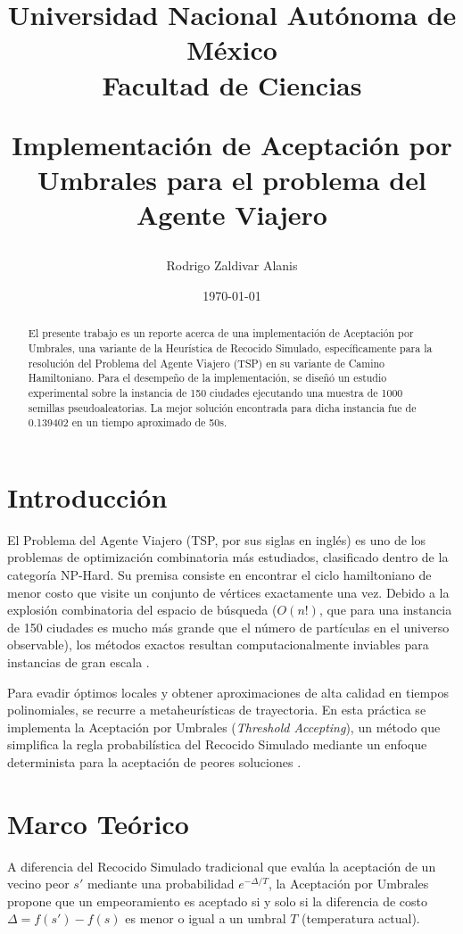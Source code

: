 \documentclass[12pt,letterpaper]{article}
\author{Rodrigo Zaldivar Alanis}
\title{
    \vspace{-2cm}
    \begin{center}
        \Large \textbf{Universidad Nacional Autónoma de México} \\
        \vspace{0.2cm}
        \large \textbf{Facultad de Ciencias} \\
    \end{center}
    \vspace{0.5cm}
    \textbf{Implementación de Aceptación por Umbrales para el problema del Agente Viajero}
}
\date{\today}
\begin{document}
\maketitle

\begin{abstract}
El presente trabajo es un reporte acerca de una implementación de Aceptación por Umbrales, una variante de la Heurística de Recocido Simulado, específicamente para la resolución del Problema del Agente Viajero (TSP) en su variante de Camino Hamiltoniano. Para el desempeño de la implementación, se diseñó un estudio experimental sobre la instancia de 150 ciudades ejecutando una muestra de 1000 semillas pseudoaleatorias. La mejor solución encontrada para dicha instancia fue de 0.139402 en un tiempo aproximado de 50s.
\end{abstract}

\section{Introducción}
El Problema del Agente Viajero (TSP, por sus siglas en inglés) es uno de los problemas de optimización combinatoria más estudiados, clasificado dentro de la categoría NP-Hard. Su premisa consiste en encontrar el ciclo hamiltoniano de menor costo que visite un conjunto de vértices exactamente una vez. Debido a la explosión combinatoria del espacio de búsqueda ($O(n!)$, que para una instancia de 150 ciudades es mucho más grande que el número de partículas en el universo observable), los métodos exactos resultan computacionalmente inviables para instancias de gran escala \cite{michalewicz2000}. 

Para evadir óptimos locales y obtener aproximaciones de alta calidad en tiempos polinomiales, se recurre a metaheurísticas de trayectoria. En esta práctica se implementa la Aceptación por Umbrales (\textit{Threshold Accepting}), un método que simplifica la regla probabilística del Recocido Simulado mediante un enfoque determinista para la aceptación de peores soluciones \cite{dueck1990}.

\section{Marco Teórico}
A diferencia del Recocido Simulado tradicional que evalúa la aceptación de un vecino peor $s'$ mediante una probabilidad $e^{-\Delta / T}$, la Aceptación por Umbrales propone que un empeoramiento es aceptado si y solo si la diferencia de costo $\Delta = f(s') - f(s)$ es menor o igual a un umbral $T$ (temperatura actual). 
\end{document}
